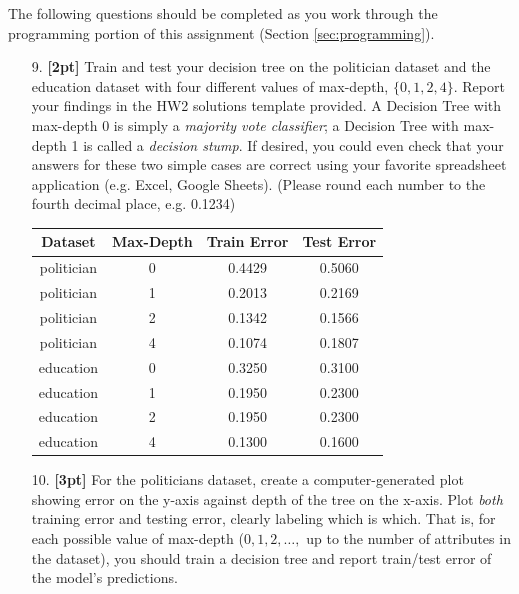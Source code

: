 \documentclass[11pt]{article}
\numberwithin{equation}{section} %
\numberwithin{figure}{section} %
\numberwithin{table}{section} %
\begin{document}
The following questions should be completed as you work through the programming portion of this assignment (Section \ref{sec:programming}).

 \begin{enumerate}
    \item[9.] \textbf{[2pt]} Train and test your decision tree on the politician dataset and the education dataset with four different values of max-depth, $\{0,1,2,4\}$. Report your findings in the HW2 solutions template provided. A Decision Tree with max-depth 0 is simply a \emph{majority vote classifier}; a Decision Tree with max-depth 1 is called a \emph{decision stump}. If desired, you could even check that your answers for these two simple cases are correct using your favorite spreadsheet application (e.g. Excel, Google Sheets). (Please round each number to the fourth decimal place, e.g. 0.1234)
    
    \begin{center}
    \begin{tabular}{cc|c|c}
        \toprule
      {\bf Dataset}   & {\bf Max-Depth} & {\bf Train Error} & {\bf Test Error} \\
      \midrule
        politician & 0 & 0.4429 & 0.5060\\
        politician & 1 & 0.2013 & 0.2169\\
        politician & 2 & 0.1342 & 0.1566\\
        politician & 4 & 0.1074 & 0.1807\\
        \midrule
        education & 0 & 0.3250 & 0.3100\\
        education & 1 & 0.1950 & 0.2300\\
        education & 2 & 0.1950 & 0.2300\\
        education & 4 & 0.1300 & 0.1600\\
        \bottomrule
    \end{tabular}
    \end{center}
    
    
    \item[10.] \textbf{[3pt]} For the politicians dataset, create a computer-generated plot showing error on the y-axis against depth of the tree on the x-axis. Plot \emph{both} training error and testing error, clearly labeling which is which.  That is, for each possible value of max-depth ($0, 1, 2, \ldots,$ up to the number of attributes in the dataset), you should train a decision tree and report train/test error of the model's predictions.
    

\end{enumerate}
\end{document}
